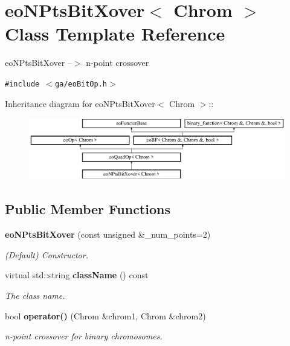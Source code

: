 \section{eo\-NPts\-Bit\-Xover$<$ Chrom $>$ Class Template Reference}
\label{classeo_n_pts_bit_xover}
eo\-NPts\-Bit\-Xover --$>$ n-point crossover  


{\tt \#include $<$ga/eo\-Bit\-Op.h$>$}

Inheritance diagram for eo\-NPts\-Bit\-Xover$<$ Chrom $>$::\begin{figure}[H]
\begin{center}
\leavevmode
\includegraphics[height=2.70531cm]{classeo_n_pts_bit_xover}
\end{center}
\end{figure}
\subsection*{Public Member Functions}
\begin{CompactItemize}
\item 
{\bf eo\-NPts\-Bit\-Xover} (const unsigned \&\_\-num\_\-points=2)\label{classeo_n_pts_bit_xover_a0}

\begin{CompactList}\small\item\em (Default) Constructor. \item\end{CompactList}\item 
virtual std::string {\bf class\-Name} () const \label{classeo_n_pts_bit_xover_a1}

\begin{CompactList}\small\item\em The class name. \item\end{CompactList}\item 
bool {\bf operator()} (Chrom \&chrom1, Chrom \&chrom2)
\begin{CompactList}\small\item\em n-point crossover for binary chromosomes. \item\end{CompactList}\end{CompactItemize}
